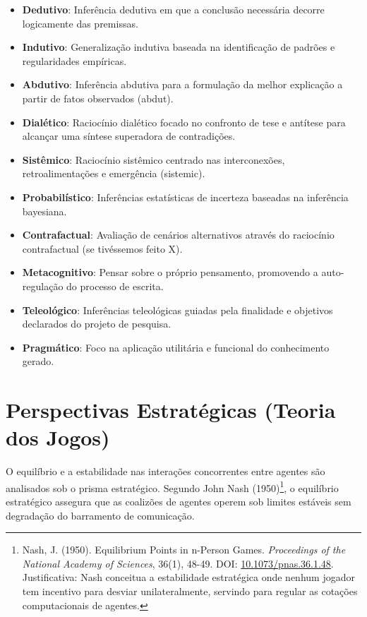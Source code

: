 \documentclass[12pt,a4paper,oneside]{abntex2}
\begin{document}
\begin{apendicesenv}
\begin{itemize}
    \item \textbf{Dedutivo}: Inferência dedutiva em que a conclusão necessária decorre logicamente das premissas.

    \item \textbf{Indutivo}: Generalização indutiva baseada na identificação de padrões e regularidades empíricas.

    \item \textbf{Abdutivo}: Inferência abdutiva para a formulação da melhor explicação a partir de fatos observados (abdut).

    \item \textbf{Dialético}: Raciocínio dialético focado no confronto de tese e antítese para alcançar uma síntese superadora de contradições.

    \item \textbf{Sistêmico}: Raciocínio sistêmico centrado nas interconexões, retroalimentações e emergência (sistemic).

    \item \textbf{Probabilístico}: Inferências estatísticas de incerteza baseadas na inferência bayesiana.

    \item \textbf{Contrafactual}: Avaliação de cenários alternativos através do raciocínio contrafactual (se tivéssemos feito X).

    \item \textbf{Metacognitivo}: Pensar sobre o próprio pensamento, promovendo a auto-regulação do processo de escrita.

    \item \textbf{Teleológico}: Inferências teleológicas guiadas pela finalidade e objetivos declarados do projeto de pesquisa.

    \item \textbf{Pragmático}: Foco na aplicação utilitária e funcional do conhecimento gerado.
\end{itemize}

\section{Perspectivas Estratégicas (Teoria dos Jogos)}

O equilíbrio e a estabilidade nas interações concorrentes entre agentes são analisados sob o prisma estratégico. Segundo John Nash (1950)\footnote{Nash, J. (1950). Equilibrium Points in n-Person Games. \textit{Proceedings of the National Academy of Sciences}, 36(1), 48-49. DOI: \href{https://doi.org/10.1073/pnas.36.1.48}{10.1073/pnas.36.1.48}. Justificativa: Nash conceitua a estabilidade estratégica onde nenhum jogador tem incentivo para desviar unilateralmente, servindo para regular as cotações computacionais de agentes.}, o equilíbrio estratégico assegura que as coalizões de agentes operem sob limites estáveis sem degradação do barramento de comunicação.


\end{apendicesenv}
\end{document}
